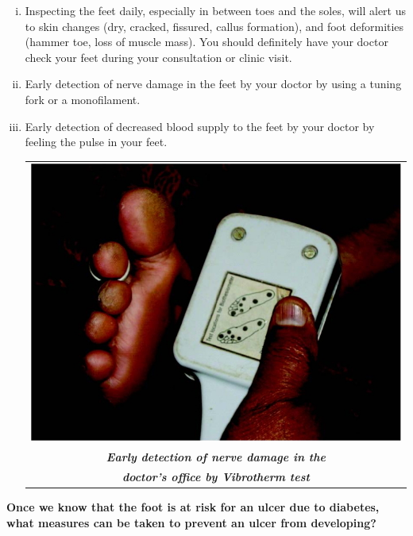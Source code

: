 \begin{enumerate}[i.] 
\itemsep=0pt
\item Inspecting the feet daily, especially in between toes and the soles, will alert us to skin changes (dry, cracked, fissured, callus formation), and foot deformities (hammer toe, loss of muscle mass). You should definitely have your doctor check your feet during your consultation or clinic visit.
\item Early detection of nerve damage in the feet by your doctor by using a tuning fork or a monofilament.
\item Early detection of decreased blood supply to the feet by your doctor by feeling the pulse in your feet.

\begin{center}
\begin{tabular}{@{}c@{}}
\includegraphics[scale=.9]{images/063.jpg}\\
{\small\textbf{\textit{Early detection of nerve damage in the}}}\\
{\small\textbf{\textit{doctor's office by Vibrotherm test}}}
\end{tabular}
\end{center}
\end{enumerate}

\noindent\textbf{Once we know that the foot is at risk for an ulcer due to diabetes, what measures can be taken to prevent an ulcer from developing?}


